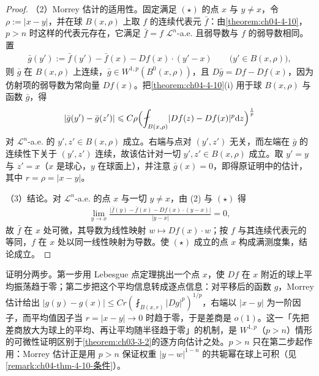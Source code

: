 \documentclass[../../main.tex]{subfiles}%
\begin{document}
\begin{proof}
（2）Morrey 估计的适用性。固定满足 $(\star)$ 的点 $x$ 与 $y\neq x$，令 $\rho:=\lvert x-y\rvert$，并在球 $B(x,\rho)$ 上取 $f$ 的连续代表元 $\bar f$：由\cref{theorem:ch04-4-10}，$p>n$ 时这样的代表元存在，它满足 $\bar f=f$ $\mathcal{L}^{n}$-a.e. 且弱导数与 $f$ 的弱导数相同。置%
\begin{align*}
\bar g(y'):=\bar f(y')-\bar f(x)-Df(x)\cdot(y'-x)\qquad\bigl(y'\in B(x,\rho)\bigr),
\end{align*}
则 $\bar g$ 在 $B(x,\rho)$ 上连续，$\bar g\in W^{1,p}(B^{0}(x,\rho))$，且 $D\bar g=Df-Df(x)$，因为仿射项的弱导数为常向量 $Df(x)$。把\cref{theorem:ch04-4-10}(i) 用于球 $B(x,\rho)$ 与函数 $\bar g$，得%
\begin{align*}
\lvert\bar g(y')-\bar g(z')\rvert\leqslant C\rho\Bigl(\fint_{B(x,\rho)}\lvert Df(z)-Df(x)\rvert^{p}\diff z\Bigr)^{\frac{1}{p}}
\end{align*}
对 $\mathcal{L}^{n}$-a.e. 的 $y',z'\in B(x,\rho)$ 成立。右端与点对 $(y',z')$ 无关，而左端在 $\bar g$ 的连续性下关于 $(y',z')$ 连续，故该估计对一切 $y',z'\in B(x,\rho)$ 成立。取 $y'=y$ 与 $z'=x$（$x$ 是球心，$y$ 在球面上），并注意 $\bar g(x)=0$，即得原证明中的估计，其中 $r=\rho=\lvert x-y\rvert$。

（3）结论。对 $\mathcal{L}^{n}$-a.e. 的点 $x$ 与一切 $y\neq x$，由 (2) 与 $(\star)$ 得
\begin{align*}
\lim_{y\to x}\frac{\lvert\bar f(y)-\bar f(x)-Df(x)\cdot(y-x)\rvert}{\lvert y-x\rvert}=0,
\end{align*}
故 $\bar f$ 在 $x$ 处可微，其导数为线性映射 $w\mapsto Df(x)\cdot w$；按 $f$ 与其连续代表元的等同，$f$ 在 $x$ 处以同一线性映射为导数。使 $(\star)$ 成立的点 $x$ 构成满测度集，结论成立。
\end{proof}

\begin{remark}\label{remark:ch06-thm-6-5-动机}
证明分两步。第一步用 Lebesgue 点定理挑出一个点 $x$，使 $Df$ 在 $x$ 附近的球上平均振荡趋于零；第二步把这个平均信息转成逐点信息：对平移后的函数 $g$，Morrey 估计给出 $\lvert g(y)-g(x)\rvert\leqslant Cr(\fint_{B(x,r)}\lvert Dg\rvert^{p})^{1/p}$，右端以 $\lvert x-y\rvert$ 为一阶因子，而平均值因子当 $r=\lvert x-y\rvert\to0$ 时趋于零，于是差商是 $o(1)$。这一「先把差商放大为球上的平均、再让平均随半径趋于零」的机制，是 $W^{1,p}$（$p>n$）情形的可微性证明区别于\cref{theorem:ch03-3-2}的逐方向估计之处。$p>n$ 只在第二步起作用：Morrey 估计正是用 $p>n$ 保证权重 $\lvert y-w\rvert^{1-n}$ 的共轭幂在球上可积（见\cref{remark:ch04-thm-4-10-条件}）。%
\end{remark}
\end{document}
